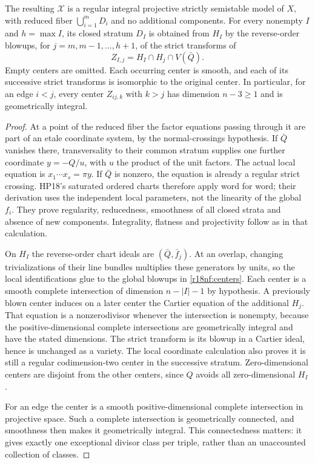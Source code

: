 \begin{lemma}
\label{r18nf:model}
The resulting $\mathcal X$ is a regular integral projective
strictly semistable model of $X$, with reduced fiber
$\bigcup_{i=1}^m D_i$ and no additional components.
For every nonempty $I$ and $h=\max I$, its closed stratum $D_I$
is obtained from $H_I$ by the reverse-order blowups, for
$j=m,m-1,\ldots,h+1$, of the strict transforms of
\[
                    Z_{I,j}=H_I\cap H_j\cap V(\bar Q).
 \tag{NF18.3}\label{r18nf:centers}
\]
Empty centers are omitted.  Each occurring center is smooth,
and each of its successive strict transforms is isomorphic to
the original center.  In particular, for an edge $i<j$, every
center $Z_{ij,k}$ with $k>j$ has dimension $n-3\ge1$ and is
geometrically integral.
\end{lemma}

\begin{proof}
At a point of the reduced fiber the factor equations passing
through it are part of an etale coordinate system, by the
normal-crossings hypothesis.  If $\bar Q$ vanishes there,
transversality to their common stratum supplies one further
coordinate $y=-Q/u$, with $u$ the product of the unit factors.
The actual local equation is $x_1\cdots x_s=\pi y$.
If $\bar Q$ is nonzero, the equation is already a regular
strict crossing.  HP18's saturated ordered charts therefore
apply word for word; their derivation uses the independent
local parameters, not the linearity of the global $f_i$.
They prove regularity, reducedness, smoothness of all closed
strata and absence of new components.  Integrality, flatness
and projectivity follow as in that calculation.

On $H_I$ the reverse-order chart ideals are
$(\bar Q,\bar f_j)$.  At an overlap, changing trivializations
of their line bundles multiplies these generators by units,
so the local identifications glue to the global blowups in
\eqref{r18nf:centers}.  Each center is a smooth complete
intersection of dimension $n-|I|-1$ by hypothesis.
A previously blown center induces on a later center the
Cartier equation of the additional $H_j$.  That equation is
a nonzerodivisor whenever the intersection is nonempty,
because the positive-dimensional complete intersections are
geometrically integral and have the stated dimensions.
The strict transform is its blowup in a Cartier ideal,
hence is unchanged as a variety.  The local coordinate
calculation also proves it is still a regular codimension-two
center in the successive stratum.  Zero-dimensional centers
are disjoint from the other centers, since $Q$ avoids all
zero-dimensional $H_I$.

For an edge the center is a smooth positive-dimensional
complete intersection in projective space.  Such a complete
intersection is geometrically connected, and smoothness then
makes it geometrically integral.  This connectedness matters:
it gives exactly one exceptional divisor class per triple,
rather than an unaccounted collection of classes.
\end{proof}

